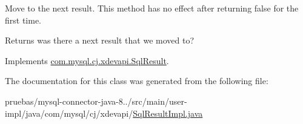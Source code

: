 Move to the next result. This method has no effect after returning {\ttfamily false} for the first time.

\begin{DoxyReturn}{Returns}
was there a next result that we moved to? 
\end{DoxyReturn}


Implements \mbox{\hyperlink{interfacecom_1_1mysql_1_1cj_1_1xdevapi_1_1_sql_result_ad5c821bd2efe2e952aef48dc574e913d}{com.\+mysql.\+cj.\+xdevapi.\+Sql\+Result}}.



The documentation for this class was generated from the following file\+:\begin{DoxyCompactItemize}
\item 
pruebas/mysql-\/connector-\/java-\/8../src/main/user-\/impl/java/com/mysql/cj/xdevapi/\mbox{\hyperlink{_sql_result_impl_8java}{Sql\+Result\+Impl.\+java}}\end{DoxyCompactItemize}
